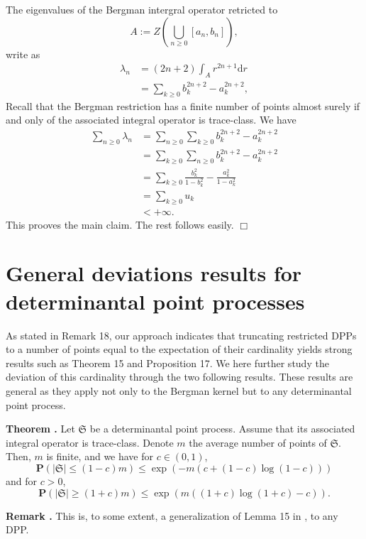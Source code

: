 \documentclass[11pt]{article}
\newcommand{\qed}{\hfill$\Box$}
\newcounter{cnt}
\newcommand{\cnt}{\thecnt \stepcounter{cnt}}
\begin{document}
The eigenvalues of the Bergman intergral operator retricted to 
\[
    A := Z\left( \bigcup_{n \ge 0} [a_n, b_n]\right),
\]
write as
\begin{align*}
    \lambda_n &= (2n+2) \int_A r^{2n+1} \mathrm d r \\
    &= \sum_{k \ge 0} b_k^{2n+2} - a_k^{2n+2},
\end{align*}
Recall that the Bergman restriction has a finite number of points almost surely if and only of the associated integral operator is trace-class. We have
\begin{align*}
    \sum_{n \ge 0} \lambda_n &= \sum_{n \ge 0} \sum_{k \ge 0} b_k^{2n+2} - a_k^{2n+2} \\
    &= \sum_{k \ge 0} \sum_{n \ge 0} b_k^{2n+2} - a_k^{2n+2} \\
    &= \sum_{k \ge 0} \frac{b_k^2}{1-b_k^2} - \frac{a_k^2}{1-a_k^2} \\
    &= \sum_{k \ge 0} u_k  \\
    &< +\infty.
\end{align*}
This prooves the main claim. The rest follows easily. \qed

\section{General deviations results for determinantal point processes}

As stated in Remark 18, our approach indicates that truncating restricted DPPs to a number of points equal to the expectation of their cardinality yields strong results such as Theorem 15 and Proposition 17. We here further study the deviation of this cardinality through the two following results. These results are general as they apply not only to the Bergman kernel but to any determinantal point process.

\textbf{Theorem \cnt.} Let $\mathfrak S $ be a determinantal point process. Assume that its associated integral operator is trace-class. Denote $m$ the average number of points of $ \mathfrak S$. Then, $ m $ is finite, and we have for $ c \in (0,1) $,
\[
    \mathbf P( | \mathfrak S | \leqslant (1-c) m ) \leqslant \exp( -m(c +(1-c) \log(1-c) ) )
\]
and for $ c > 0 $,
\[
    \mathbf P( | \mathfrak S | \geqslant (1+c) m ) \leqslant \exp( m ((1+c) \log(1+c) - c )). %
\]

\textbf{Remark \cnt.} This is, to some extent, a generalization of Lemma 15 in \cite{DecreusefondMoroz2021}, to any DPP.
\end{document}
